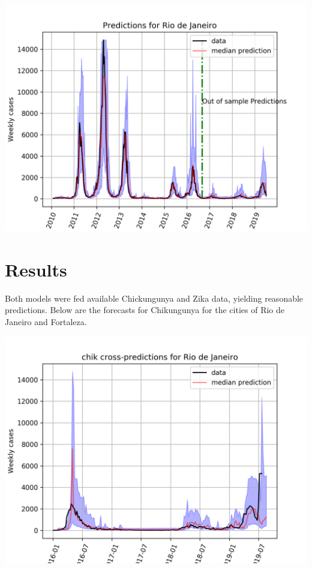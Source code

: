 \documentclass[a0,portrait]{a0poster}
\begin{document}
\begin{multicols}{3}
\begin{center}\vspace{1cm}
\includegraphics[width=0.9\linewidth]{figures/qf_Rio_de_Janeiro_dengue.png}
\label{fig:dengue_RQF}
\end{center}%

\section*{Results}

\noindent
Both models were fed available Chickungunya and Zika data, yielding 
reasonable predictions. Below are the forecasts for Chikungunya for the cities 
of Rio de Janeiro and Fortaleza.

\begin{center}\vspace{1cm}
\includegraphics[width=0.9\linewidth]{figures/qf_chik_cross_Rio_de_Janeiro.png} 
\label{fig:chik_rio_de_janeiro}
\end{center}%


\end{multicols}
\end{document}

